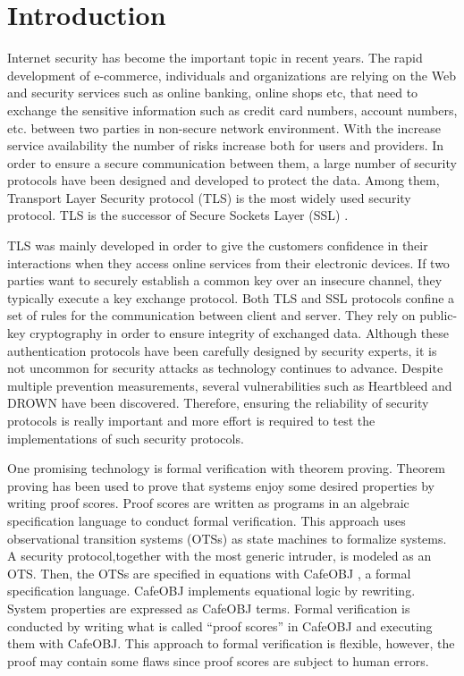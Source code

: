 \documentclass[a4paper,fleqn]{cas-dc}
\begin{document}
\maketitle

\section{Introduction}\label{intro}
Internet security has become the important topic in recent years. The rapid development of e-commerce, individuals and organizations are relying on the Web and security services such as online banking, online shops etc, that need to exchange the sensitive information such as credit card numbers, account numbers, etc. between two parties in non-secure network environment. With the increase service availability the number of risks increase both for users and providers. In order to ensure a secure communication between them, a large number of security protocols have been designed and developed to protect the data. Among them, Transport Layer Security protocol (TLS) \cite{dierk} is the most widely used security protocol. TLS is the successor of Secure Sockets Layer (SSL) \cite{1621007}. 

TLS was mainly developed in order to give the customers
confidence in their interactions when they access online services
from their electronic devices. If two parties want to securely establish a common key over an insecure channel, they typically execute a key exchange protocol. Both TLS and SSL protocols confine a set of rules for the communication between client and server. They rely on public-key cryptography in order to ensure integrity of exchanged data. Although  these  authentication  protocols  have been carefully designed by security experts, it is not uncommon for security attacks  as  technology  continues  to  advance. Despite multiple prevention measurements, several vulnerabilities such as  
Heartbleed \cite{10.1145/2663716.2663755} and DROWN \cite{197245} have been discovered. Therefore, ensuring the reliability of security protocols is really important and more effort is required to test the implementations of such security protocols.

One promising technology is formal verification  with theorem  proving. Theorem proving has been used to prove that systems enjoy some desired properties by writing proof scores. Proof scores are written as programs in an algebraic specification language to conduct formal verification. This approach uses observational transition systems (OTSs) \cite{OgataF03fmoods} as state machines to formalize systems. A security protocol,together with the most generic intruder, is modeled as an OTS. Then, the OTSs are specified in equations with CafeOBJ \cite{DiaconescuF98amast}, a formal specification language. CafeOBJ implements equational logic by rewriting. System properties are expressed as CafeOBJ terms. Formal verification is conducted by writing what is called ``proof scores'' \cite{OgataF03fmoods} in CafeOBJ and executing them with CafeOBJ. This approach to formal verification is flexible, however, the proof may contain some flaws since proof scores are subject to human errors. 
\end{document}
